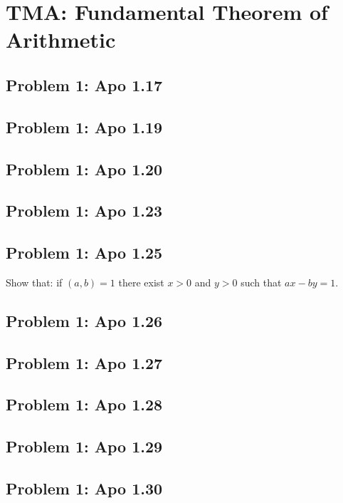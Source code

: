 \section{TMA: Fundamental Theorem of Arithmetic}

\subsection[Problem 1]{Problem 1: Apo 1.17}

\subsection[Problem 2]{Problem 1: Apo 1.19}

\subsection[Problem 3]{Problem 1: Apo 1.20}

\subsection[Problem 4]{Problem 1: Apo 1.23}

\subsection[Problem 5]{Problem 1: Apo 1.25}
Show that: if $(a, b) = 1$ there exist $x >0$ and $y > 0$ such that $ax - by = 1$.

\subsection[Problem 6]{Problem 1: Apo 1.26}

\subsection[Problem 7]{Problem 1: Apo 1.27}

\subsection[Problem 8]{Problem 1: Apo 1.28}

\subsection[Problem 9]{Problem 1: Apo 1.29}

\subsection[Problem 10]{Problem 1: Apo 1.30}